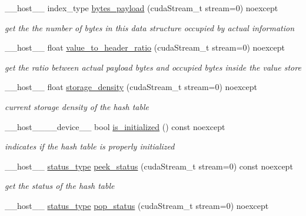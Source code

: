 \begin{DoxyCompactItemize}
\+\_\+\+\_\+host\+\_\+\+\_\+ index\+\_\+type \hyperlink{classwarpcore_1_1MultiValueHashTable_a977baa47c1b37eeeb591dd13d76d184a}{bytes\+\_\+payload} (cuda\+Stream\+\_\+t stream=0) noexcept
\begin{DoxyCompactList}\small\item\em get the the number of bytes in this data structure occupied by actual information \end{DoxyCompactList}\item 
\+\_\+\+\_\+host\+\_\+\+\_\+ float \hyperlink{classwarpcore_1_1MultiValueHashTable_a431ef6fae4419af72cf565430abbf7b6}{value\+\_\+to\+\_\+header\+\_\+ratio} (cuda\+Stream\+\_\+t stream=0) noexcept
\begin{DoxyCompactList}\small\item\em get the ratio between actual payload bytes and occupied bytes inside the value store \end{DoxyCompactList}\item 
\+\_\+\+\_\+host\+\_\+\+\_\+ float \hyperlink{classwarpcore_1_1MultiValueHashTable_ab8731334f269b625d8fea853f81c05b4}{storage\+\_\+density} (cuda\+Stream\+\_\+t stream=0) noexcept
\begin{DoxyCompactList}\small\item\em current storage density of the hash table \end{DoxyCompactList}\item 
\+\_\+\+\_\+host\+\_\+\+\_\+\+\_\+\+\_\+device\+\_\+\+\_\+ bool \hyperlink{classwarpcore_1_1MultiValueHashTable_a206e52ad175b2d6d7abbaae25fa19c7f}{is\+\_\+initialized} () const noexcept
\begin{DoxyCompactList}\small\item\em indicates if the hash table is properly initialized \end{DoxyCompactList}\item 
\+\_\+\+\_\+host\+\_\+\+\_\+ \hyperlink{classwarpcore_1_1Status}{status\+\_\+type} \hyperlink{classwarpcore_1_1MultiValueHashTable_a3e494c09904b4ea2c68c623641a391f3}{peek\+\_\+status} (cuda\+Stream\+\_\+t stream=0) const noexcept
\begin{DoxyCompactList}\small\item\em get the status of the hash table \end{DoxyCompactList}\item 
\+\_\+\+\_\+host\+\_\+\+\_\+ \hyperlink{classwarpcore_1_1Status}{status\+\_\+type} \hyperlink{classwarpcore_1_1MultiValueHashTable_af944a4ab507f431152657930db9cae99}{pop\+\_\+status} (cuda\+Stream\+\_\+t stream=0) noexcept

\end{DoxyCompactItemize}
